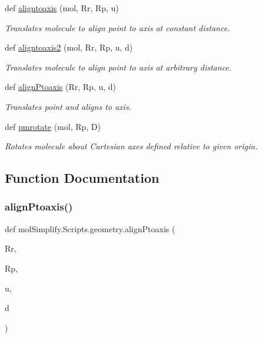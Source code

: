 \begin{DoxyCompactItemize}
def \hyperlink{namespacemolSimplify_1_1Scripts_1_1geometry_ae639e596da3de910ae56f9ced7d336e9}{aligntoaxis} (mol, Rr, Rp, u)
\begin{DoxyCompactList}\small\item\em Translates molecule to align point to axis at constant distance. \end{DoxyCompactList}\item 
def \hyperlink{namespacemolSimplify_1_1Scripts_1_1geometry_ad1b4c0975cd5853ea6c66f707c5e55a5}{aligntoaxis2} (mol, Rr, Rp, u, d)
\begin{DoxyCompactList}\small\item\em Translates molecule to align point to axis at arbitrary distance. \end{DoxyCompactList}\item 
def \hyperlink{namespacemolSimplify_1_1Scripts_1_1geometry_a23714d51ef2a9e32e4c566497de8f506}{align\+Ptoaxis} (Rr, Rp, u, d)
\begin{DoxyCompactList}\small\item\em Translates point and aligns to axis. \end{DoxyCompactList}\item 
def \hyperlink{namespacemolSimplify_1_1Scripts_1_1geometry_a0c9d5009b8beb6cb765756fe15596191}{pmrotate} (mol, Rp, D)
\begin{DoxyCompactList}\small\item\em Rotates molecule about Cartesian axes defined relative to given origin. \end{DoxyCompactList}\end{DoxyCompactItemize}


\subsection{Function Documentation}
\mbox{\label{namespacemolSimplify_1_1Scripts_1_1geometry_a23714d51ef2a9e32e4c566497de8f506}} 
\subsubsection{\texorpdfstring{align\+Ptoaxis()}{alignPtoaxis()}}
{\footnotesize\ttfamily def mol\+Simplify.\+Scripts.\+geometry.\+align\+Ptoaxis (\begin{DoxyParamCaption}\item[{}]{Rr,  }\item[{}]{Rp,  }\item[{}]{u,  }\item[{}]{d }\end{DoxyParamCaption})}



